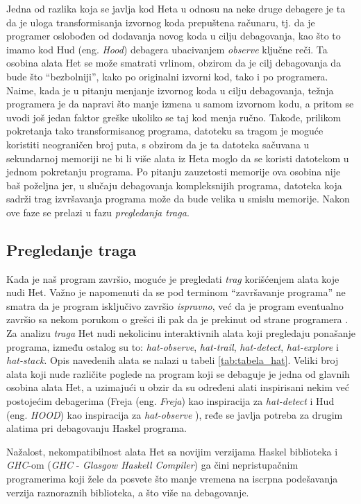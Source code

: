\documentclass[a4paper]{article}
\begin{document}
{{Jedna od razlika koja se javlja kod Heta u odnosu na neke druge debagere je ta da je uloga transformisanja izvornog koda prepuštena računaru, tj. da je programer oslobođen od dodavanja novog koda u cilju debagovanja, kao što to imamo kod Hud (eng. {\em Hood}) debagera ubacivanjem {\em observe} ključne reči.
Ta osobina alata Het se može smatrati vrlinom, obzirom da je cilj debagovanja da bude što ``bezbolniji'', kako po originalni izvorni kod, 
tako i po programera. Naime, kada je u pitanju menjanje izvornog koda u cilju debagovanja, težnja programera je da napravi što manje izmena u samom 
izvornom kodu, a pritom se uvodi još jedan faktor greške ukoliko se taj kod menja ručno.
Takođe, prilikom pokretanja tako transformisanog programa, datoteku sa tragom je moguće koristiti neograničen broj puta, s obzirom da je ta datoteka sačuvana u sekundarnoj memoriji ne bi li više alata iz Heta moglo da se koristi datotekom u jednom pokretanju programa.
Po pitanju zauzetosti memorije ova osobina nije baš poželjna jer, u slučaju debagovanja kompleksnijih programa, datoteka koja sadrži trag izvršavanja programa može da bude velika u smislu memorije.
Nakon ove faze se prelazi u fazu {\em pregledanja traga}.

\subsection{Pregledanje traga}
Kada je naš program završio, moguće je pregledati {\em trag} korišćenjem alata koje nudi Het. Važno je napomenuti da se pod terminom ``završavanje programa'' ne smatra 
da je program isključivo završio {\em ispravno}, već da je program eventualno završio sa nekom porukom o grešci ili pak da je prekinut od strane programera \cite{hat_haskell_org}.
Za analizu {\em traga} Het nudi nekolicinu interaktivnih alata koji pregledaju ponašanje programa, 
između ostalog su to: {\em hat-observe}, {\em hat-trail}, {\em hat-detect}, {\em hat-explore} i {\em hat-stack}. Opis navedenih alata se nalazi u tabeli \ref{tab:tabela_hat}.
Veliki broj alata koji nude različite poglede na program koji se debaguje je jedna od glavnih osobina alata Het, a uzimajući u obzir da su određeni alati inspirisani nekim već postojećim debagerima (Freja (eng. {\em Freja}) kao inspiracija za {\em hat-detect} i Hud (eng. {\em HOOD}) kao inspiracija za {\em hat-observe} \cite{hat_haskell_org}), ređe se javlja potreba za drugim alatima pri debagovanju Haskel programa.

Nažalost, nekompatibilnost alata Het sa novijim verzijama Haskel biblioteka i {\em GHC}-om ({\em GHC} - {\em Glasgow Haskell Compiler}) ga čini nepristupačnim programerima 
koji žele da posvete što manje vremena na iscrpna podešavanja verzija raznoraznih biblioteka, a što više na debagovanje.

}}
\end{document}
